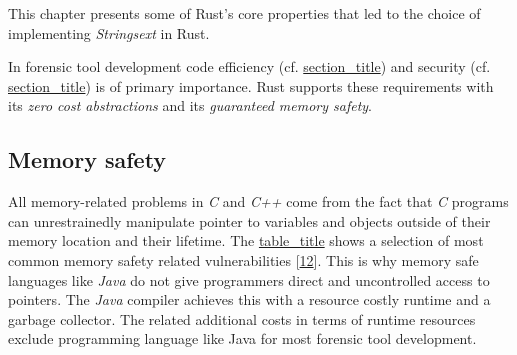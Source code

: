 This chapter presents some of Rust's core properties that led to the
choice of implementing \emph{Strings­ext} in Rust.

In forensic tool development code efficiency (cf.
\protect\hyperlink{_code_efficiency}{section\_title}) and security (cf.
\protect\hyperlink{security1}{section\_title}) is of primary importance.
Rust supports these requirements with its \emph{zero cost abstractions}
and its \emph{guaranteed memory safety}.

\hypertarget{_memory_safety}{\subsection{Memory
safety}\label{_memory_safety}}

All memory-related problems in \emph{C} and \emph{C++} come from the
fact that \emph{C} programs can unrestrainedly manipulate pointer to
variables and objects outside of their memory location and their
lifetime. The \protect\hyperlink{c-memory-safety-bugs}{table\_title}
shows a selection of most common memory safety related vulnerabilities
{[}\protect\hyperlink{mitrecorporation2016}{12}{]}. This is why memory
safe languages like \emph{Java} do not give programmers direct and
uncontrolled access to pointers. The \emph{Java} compiler achieves this
with a resource costly runtime and a garbage collector. The related
additional costs in terms of runtime resources exclude programming
language like Java for most forensic tool development.

